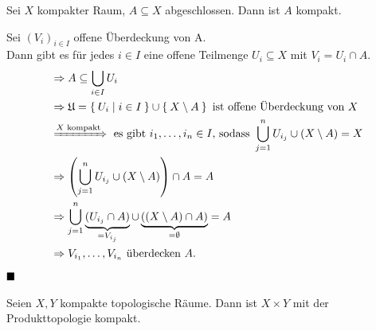 \begin{bemerkung}\label{abgeschlossenInKomaktIstKompakt}
    Sei $X$ kompakter Raum, $A \subseteq X$ abgeschlossen. Dann ist
    $A$ kompakt.
\end{bemerkung}

\begin{beweis}
    Sei $(V_{i})_{i \in I}$ offene Überdeckung von A.\\
    Dann gibt es für jedes $i \in I$ eine offene Teilmenge $U_{i} \subseteq X$ mit $V_{i}=U_{i} \cap A$.
    \begin{align*}
        &\Rightarrow A \subseteq \bigcup_{i \in I} U_i\\
        &\Rightarrow \mathfrak{U} = \Set{U_i | i \in I} \cup \Set{X \setminus A} \text{ ist offene Überdeckung von } X\\
        &\xRightarrow{X \text{ kompakt}} \text{ es gibt } i_1, \dots, i_n \in I\text{, sodass }\bigcup_{j=1}^n U_{i_j} \cup (X \setminus A) = X\\
        &\Rightarrow \left (\bigcup_{j=1}^n U_{i_j} \cup (X \setminus A)\right ) \cap A = A\\
        &\Rightarrow \bigcup_{j=1}^n \underbrace{(U_{i_j} \cap A)}_{= V_{i_j}} \cup \underbrace{((X \setminus A) \cap A)}_{= \emptyset} = A\\
        &\Rightarrow V_{i_1}, \dots, V_{i_n} \text{ überdecken } A\text{.}
    \end{align*}
    $\qed$
\end{beweis}

\begin{bemerkung}\label{kompaktTimesKompaktIstKompakt}
    Seien $X, Y$ kompakte topologische Räume. Dann ist $X \times Y$
    mit der Produkttopologie kompakt.
\end{bemerkung}

